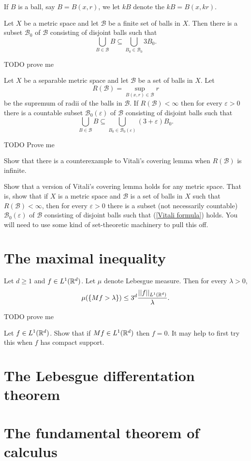 \begin{definition}
If $B$ is a ball, say $B = B(x, r)$, we let $kB$ denote the  $kB = B(x, kr)$.
\end{definition}
\begin{lemma}
Let $X$ be a metric space and let $\mathcal B$ be a finite set of balls in $X$. Then there is a subset $\mathcal B_0$ of $\mathcal B$ consisting of disjoint balls such that
\[\bigcup_{B \in \mathcal B} B \subseteq \bigcup_{B_0 \in \mathcal B_0} 3B_0.\]
\end{lemma}
TODO prove me
\begin{theorem}
Let $X$ be a separable metric space and let $\mathcal B$ be a set of balls in $X$. Let
\[R(\mathcal B) = \sup_{B(x, r) \in \mathcal B} r\]
be the supremum of radii of the balls in $\mathcal B$. If $R(\mathcal B) < \infty$ then for every $\varepsilon > 0$ there is a countable subset $\mathcal B_0(\varepsilon)$ of $\mathcal B$ consisting of disjoint balls such that
\begin{equation}\label{Vitali formula}
\bigcup_{B \in \mathcal B} B \subseteq \bigcup_{B_0 \in \mathcal B_0(\varepsilon)} (3 + \varepsilon)B_0.
\end{equation}
\end{theorem}
TODO Prove me

\begin{exercise}
Show that there is a counterexample to Vitali's covering lemma when $R(\mathcal B)$ is infinite.
\end{exercise}

\begin{exercise}
Show that a version of Vitali's covering lemma holds for any metric space.
That is, show that if $X$ is a metric space and $\mathcal B$ is a set of balls in $X$ such that $R(\mathcal B) < \infty$, then for every $\varepsilon > 0$ there is a subset (not necessarily countable) $\mathcal B_0(\varepsilon)$ of $\mathcal B$ consisting of disjoint balls such that (\ref{Vitali formula}) holds.
You will need to use some kind of set-theoretic machinery to pull this off.
\end{exercise}

\section{The maximal inequality}

\begin{theorem}
Let $d \geq 1$ and $f \in L^1(\mathbb{R}^d)$. Let $\mu$ denote Lebesgue measure. Then for every $\lambda > 0$,
\[\mu(\{Mf > \lambda\}) \leq 3^{d} \frac{||f||_{L^1(\mathbb{R}^d)}}{\lambda}.\]
\end{theorem}
TODO prove me

\begin{exercise}
Let $f \in L^1(\mathbb{R}^d)$.
Show that if $Mf \in L^1(\mathbb{R}^d)$ then $f = 0$.
It may help to first try this when $f$ has compact support.
\end{exercise}

\section{The Lebesgue differentation theorem}

\section{The fundamental theorem of calculus}
